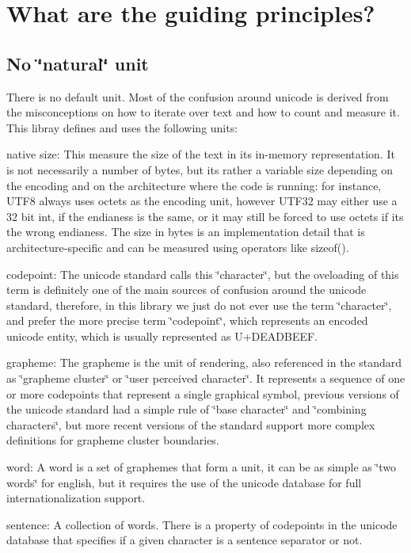 \section*{What are the guiding principles?}

\subsection*{No \char`\"{}natural\char`\"{} unit}

There is no default unit. Most of the confusion around unicode is derived from the misconceptions on how to iterate over text and how to count and measure it. This libray defines and uses the following units\+:


\begin{DoxyEnumerate}
\item native size\+: This measure the size of the text in its in-\/memory representation. It is not necessarily a number of bytes, but it\textquotesingle{}s rather a variable size depending on the encoding and on the architecture where the code is running\+: for instance, U\+T\+F8 always uses octets as the encoding unit, however U\+T\+F32 may either use a 32 bit int, if the endianess is the same, or it may still be forced to use octets if it\textquotesingle{}s the wrong endianess. The size in bytes is an implementation detail that is architecture-\/specific and can be measured using operators like sizeof().
\item codepoint\+: The unicode standard calls this \char`\"{}character\char`\"{}, but the oveloading of this term is definitely one of the main sources of confusion around the unicode standard, therefore, in this library we just do not ever use the term \char`\"{}character\char`\"{}, and prefer the more precise term \char`\"{}codepoint\char`\"{}, which represents an encoded unicode entity, which is usually represented as U+\+D\+E\+A\+D\+B\+E\+EF.
\item grapheme\+: The grapheme is the unit of rendering, also referenced in the standard as \char`\"{}grapheme cluster\char`\"{} or \char`\"{}user perceived
   character\char`\"{}. It represents a sequence of one or more codepoints that represent a single graphical symbol, previous versions of the unicode standard had a simple rule of \char`\"{}base character\char`\"{} and \char`\"{}combining characters\char`\"{}, but more recent versions of the standard support more complex definitions for grapheme cluster boundaries.
\item word\+: A word is a set of graphemes that form a unit, it can be as simple as \char`\"{}two words\char`\"{} for english, but it requires the use of the unicode database for full internationalization support.
\item sentence\+: A collection of words. There is a property of codepoints in the unicode database that specifies if a given character is a sentence separator or not.
\end{DoxyEnumerate}

